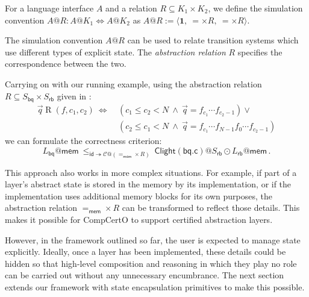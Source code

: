 \documentclass[acmsmall,screen,review,anonymous]{acmart}
\newcommand{\kw}[1]{\ensuremath{ \mathsf{#1} }}
\newcommand{\Clight}{\ensuremath{ \mathsf{Clight} }}
\begin{document}
\begin{definition}
For a language interface $A$ and a relation $R \subseteq K_1 \times K_2$,
we define the simulation convention $A@R : A@K_1 \Leftrightarrow A@K_2$ as
$
  A@R := \langle \mathbf{1}, \: {=} \times R, \: {=} \times R \rangle
$.
\end{definition}

The simulation convention $A@R$
can be used to relate transition systems which use
different types of explicit state.
The \emph{abstraction relation} $R$
specifies the correspondence between the two.

\begin{example}[Correctness of \kw{bq.c}] \label{ex:bqcorrect}
Carrying on with our running example,
using the abstraction relation $R \subseteq S_\kw{bq} \times S_\kw{rb}$
given in \citet{rbgs-cal}:
\begin{align*}
  \vec{q} \mathrel{R} (f, c_1, c_2) \:\Leftrightarrow\: {}
    & (c_1 \le c_2 < N \:\wedge\: \vec{q} = f_{c_1} \cdots f_{c_2-1}) \vee {} \\
    & (c_2 \le c_1 < N \:\wedge\: \vec{q} = f_{c_1} \cdots f_{N-1} f_0 \cdots f_{c_2 - 1})
\end{align*}
we can formulate the correctness criterion:
\[
  L_\kw{bq}@\kw{mem}
  \:\le_{\kw{id} \twoheadrightarrow \mathcal{C}@({=}_\kw{mem} \times R)}\:
  \Clight(\kw{bq.c})@S_\kw{rb} \odot
  L_\kw{rb}@\kw{mem}
  \,.
\]
\end{example}

This approach also works in more complex situations.
For example,
if part of a layer's abstract state is
stored in the memory by its implementation,
or if the implementation uses additional memory blocks
for its own purposes,
the abstraction relation ${=}_\kw{mem} \times R$
can be transformed to reflect those details.
This makes it possible for CompCertO
to support certified abstraction layers.

However,
in the framework outlined so far,
the user is expected to manage state explicitly.
Ideally,
once a layer has been implemented,
these details could be hidden so that
high-level composition and reasoning
in which they play no role
can be carried out without any unnecessary
encumbrance.
The next section
extends our framework
with state encapsulation primitives
to make this possible.

\end{document}
